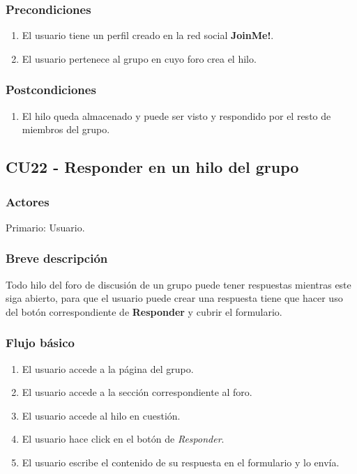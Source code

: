 \documentclass[12pt, a4paper, titlepage]{article}
\begin{document}
\subsubsection{Precondiciones}
\begin{enumerate}
	\item El usuario tiene un perfil creado en la red social \textbf{JoinMe!}.
	\item El usuario pertenece al grupo en cuyo foro crea el hilo.
\end{enumerate}
\subsubsection{Postcondiciones}
\begin{enumerate}
	\item El hilo queda almacenado y puede ser visto y respondido por el resto de miembros del grupo.
\end{enumerate}


\subsection{CU22 - Responder en un hilo del grupo}
\subsubsection{Actores}
Primario: Usuario.
\subsubsection{Breve descripción}
Todo hilo del foro de discusión de un grupo puede tener respuestas mientras este siga abierto, para que el usuario puede crear una respuesta tiene que hacer uso del botón correspondiente de \textbf{Responder} y cubrir el formulario.

\subsubsection{Flujo básico}
\begin{enumerate}
	\item El usuario accede a la página del grupo.
	\item El usuario accede a la sección correspondiente al foro.
	\item El usuario accede al hilo en cuestión.
	\item El usuario hace click en el botón de \textit{Responder}.
	\item El usuario escribe el contenido de su respuesta en el formulario y lo envía.
\end{enumerate}
\end{document}
